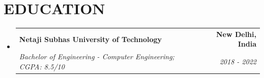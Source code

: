 \documentclass[letterpaper,11pt]{article}
\makeatletter
\newcommand{\resumeSubheading}[4]{
  \vspace{-2pt}\item
    \begin{tabular*}{1.0\textwidth}[t]{l@{\extracolsep{\fill}}r}
      \textbf{\large#1} & \textbf{\small #2} \\
      \textit{\large#3} & \textit{\small #4} \\
    \end{tabular*}\vspace{-7pt}
}
\newcommand{\resumeSubHeadingListStart}{\begin{itemize}[leftmargin=0.0in, label={}]}
\newcommand{\resumeSubHeadingListEnd}{\end{itemize}}
\makeatother
\begin{document}
\section{EDUCATION}
  \resumeSubHeadingListStart
    \resumeSubheading
      {Netaji Subhas University of Technology}{New Delhi, India}
      {Bachelor of Engineering - Computer Engineering; CGPA: 8.5/10}{2018 - 2022}
  \resumeSubHeadingListEnd
\end{document}
